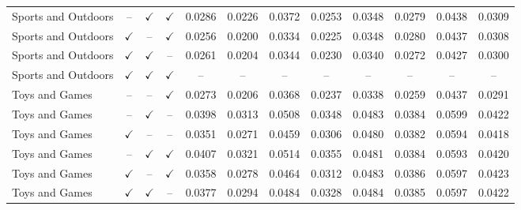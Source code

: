 \documentclass[11pt]{article}
\begin{document}
\begin{table}[!t]
{\begin{tabular}{lccc|cccc|cccc}
Sports and Outdoors & -- & $\checkmark$ & $\checkmark$ & 0.0286 & 0.0226 & 0.0372 & 0.0253 & 0.0348 & 0.0279 & 0.0438 & 0.0309\\
Sports and Outdoors & $\checkmark$ & -- & $\checkmark$ & 0.0256 & 0.0200 & 0.0334 & 0.0225 & 0.0348 & 0.0280 & 0.0437 & 0.0308\\
Sports and Outdoors & $\checkmark$ & $\checkmark$ & -- & 0.0261 & 0.0204 & 0.0344 & 0.0230 & 0.0340 & 0.0272 & 0.0427 & 0.0300\\
Sports and Outdoors & $\checkmark$ & $\checkmark$ & $\checkmark$ & -- & -- & -- & -- & -- & -- & -- & --\\
\midrule
Toys and Games & -- & -- & $\checkmark$ & 0.0273 & 0.0206 & 0.0368 & 0.0237 & 0.0338 & 0.0259 & 0.0437 & 0.0291\\
Toys and Games & -- & $\checkmark$ & -- & 0.0398 & 0.0313 & 0.0508 & 0.0348 & 0.0483 & 0.0384 & 0.0599 & 0.0422\\
Toys and Games & $\checkmark$ & -- & -- & 0.0351 & 0.0271 & 0.0459 & 0.0306 & 0.0480 & 0.0382 & 0.0594 & 0.0418\\
Toys and Games & -- & $\checkmark$ & $\checkmark$ & 0.0407 & 0.0321 & 0.0514 & 0.0355 & 0.0481 & 0.0384 & 0.0593 & 0.0420\\
Toys and Games & $\checkmark$ & -- & $\checkmark$ & 0.0358 & 0.0278 & 0.0464 & 0.0312 & 0.0483 & 0.0386 & 0.0597 & 0.0423\\
Toys and Games & $\checkmark$ & $\checkmark$ & -- & 0.0377 & 0.0294 & 0.0484 & 0.0328 & 0.0484 & 0.0385 & 0.0597 & 0.0422\\

\end{tabular}}
\end{table}
\end{document}

